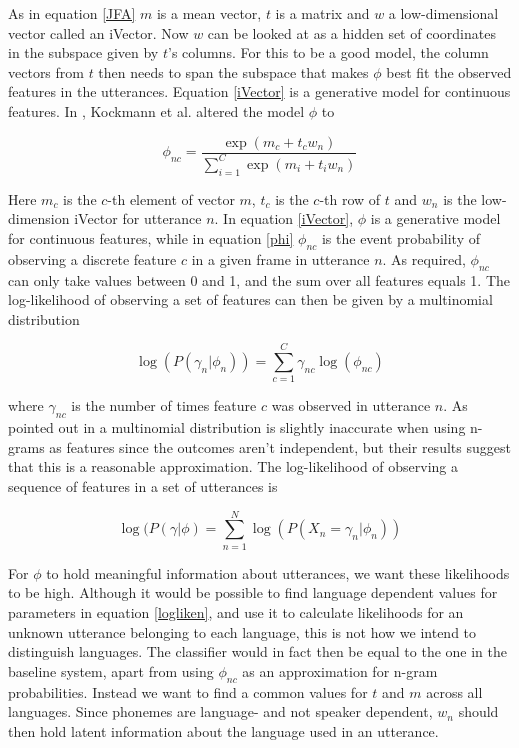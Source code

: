 As in equation \ref{JFA} $m$ is a mean vector, $t$ is a matrix and $w$ a low-dimensional vector called an iVector. Now $w$ can be looked at as a hidden set of coordinates in the subspace given by $t$'s columns. For this to be a good model, the column vectors from $t$ then needs to span the subspace that makes $\phi$ best fit the observed features in the utterances. Equation \ref{iVector} is a generative model for continuous features. In \cite{sviVector}, Kockmann et al. altered the model $\phi$ to

\begin{equation}\label{phi}
\phi_{nc}=\frac{\exp(m_c+t_cw_n)}{\sum_{i=1}^{C}\exp(m_i+t_iw_n)}
\end{equation}

Here $m_c$ is the $c$-th element of vector $m$, $t_c$ is the $c$-th row of $t$ and $w_n$ is the low-dimension iVector for utterance $n$. In equation \ref{iVector}, $\phi$ is a generative model for continuous features, while in equation \ref{phi} $\phi_{nc}$ is the event probability of observing a discrete feature $c$ in a given frame in utterance $n$. As required, $\phi_{nc}$ can only take values between 0 and 1, and the sum over all features equals 1. The log-likelihood of observing a set of features can then be given by a multinomial distribution

\begin{equation}\label{logliken}
\log(P(\gamma_n |\phi_n)) = \sum_{c=1}^{C}\gamma_{nc}\log(\phi_{nc})
\end{equation}

where $\gamma_{nc}$ is the number of times feature $c$ was observed in utterance $n$. As pointed out in \cite{liiVector} a multinomial distribution is slightly inaccurate when using n-grams as features since the outcomes aren't independent, but their results suggest that this is a reasonable approximation. The log-likelihood of observing a sequence of features in a set of utterances is

\begin{equation}\label{loglike}
\log(P(\gamma |\phi) = \sum_{n=1}^{N}\log(P(X_n=\gamma_n |\phi_n))
\end{equation}

For $\phi$ to hold meaningful information about utterances, we want these likelihoods to be high. Although it would be possible to find language dependent values for parameters in equation \ref{logliken}, and use it to calculate likelihoods for an unknown utterance belonging to each language, this is not how we intend to distinguish languages. The classifier would in fact then be equal to the one in the baseline system, apart from using $\phi_{nc}$ as an approximation for n-gram probabilities. Instead we want to find a common values for $t$ and $m$ across all languages. Since phonemes are language- and not speaker dependent, $w_n$ should then hold latent information about the language used in an utterance. 


